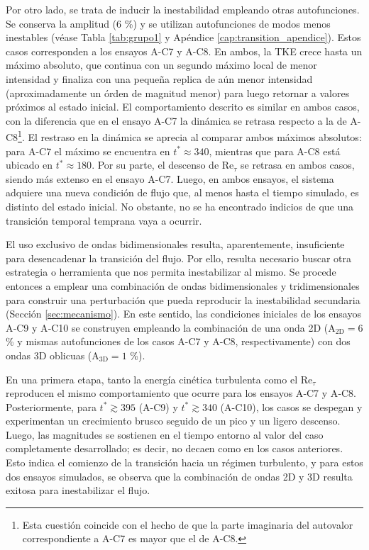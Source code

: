 Por otro lado, se trata de inducir la inestabilidad empleando otras autofunciones. Se conserva la amplitud (6 \%) y se utilizan autofunciones de modos menos inestables (véase Tabla \ref{tab:grupo1} y Apéndice \ref{cap:transition_apendice}). Estos casos corresponden a los ensayos A-C7 y A-C8. En ambos, la TKE crece hasta un máximo absoluto, que continua con un segundo máximo local de menor intensidad y finaliza con una pequeña replica de aún menor intensidad (aproximadamente un órden de magnitud menor) para luego retornar a valores próximos al estado inicial. El comportamiento descrito es similar en ambos casos, con la diferencia que en el ensayo A-C7 la dinámica se retrasa respecto a la de A-C8\footnote{ Esta cuestión coincide con el hecho de que la parte imaginaria del autovalor correspondiente a A-C7 es mayor que el de A-C8.}. El restraso en la dinámica se aprecia al comparar ambos máximos absolutos: para A-C7 el máximo se encuentra en $t^* \approx 340$, mientras que para A-C8 está ubicado en  $t^* \approx 180$. Por su parte, el descenso de Re$_{\tau}$ se retrasa en ambos casos, siendo más extenso en el ensayo A-C7. Luego, en ambos ensayos, el sistema adquiere una nueva condición de flujo que, al menos hasta el tiempo simulado, es distinto del estado inicial. No obstante, no se ha encontrado indicios de que una transición temporal temprana vaya a ocurrir.  

El uso exclusivo de ondas bidimensionales resulta, aparentemente, insuficiente para desencadenar la transición del flujo. Por ello, resulta necesario buscar otra estrategia o herramienta que nos permita inestabilizar al mismo. Se procede entonces a emplear una combinación de ondas bidimensionales y tridimensionales para construir una perturbación que pueda reproducir la inestabilidad secundaria (Sección \ref{sec:mecanismo}). En este sentido, las condiciones iniciales de los ensayos A‑C9 y A‑C10 se construyen empleando la combinación de una onda 2D (A$_\text{2D}=6$ \% y mismas autofunciones de los casos A-C7 y A-C8, respectivamente) con dos ondas 3D oblicuas (A$_\text{3D}=1$ \%). 

En una primera etapa, tanto la energía cinética turbulenta como el Re$_{\tau}$ reproducen el mismo comportamiento que ocurre para los ensayos A‑C7 y A‑C8. Posteriormente, para $t^* \gtrsim 395$ (A-C9) y $t^* \gtrsim 340$ (A-C10), los casos se despegan y experimentan un crecimiento brusco seguido de un pico y un ligero descenso. Luego, las magnitudes se sostienen en el tiempo entorno al valor del caso completamente desarrollado; es decir, no decaen como en los casos anteriores. Esto indica el comienzo de la transición hacia un régimen turbulento, y para estos dos ensayos simulados, se observa que la combinación de ondas 2D y 3D resulta exitosa para inestabilizar el flujo. 

